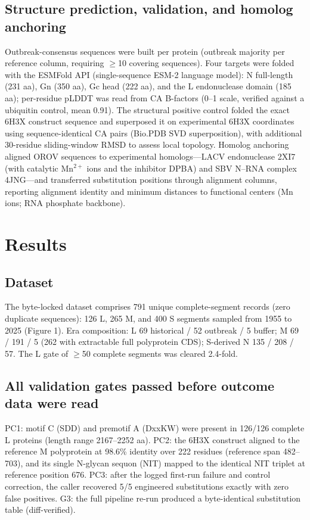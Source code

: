 \documentclass[12pt]{article}
\begin{document}
\subsection{Structure prediction, validation, and homolog anchoring}
Outbreak-consensus sequences were built per protein (outbreak majority per reference column, requiring $\geq$10 covering sequences). Four targets were folded with the ESMFold API (single-sequence ESM-2 language model): N full-length (231 aa), Gn (350 aa), Gc head (222 aa), and the L endonuclease domain (185 aa); per-residue pLDDT was read from CA B-factors (0--1 scale, verified against a ubiquitin control, mean 0.91). The structural positive control folded the exact 6H3X construct sequence and superposed it on experimental 6H3X coordinates using sequence-identical CA pairs (Bio.PDB SVD superposition), with additional 30-residue sliding-window RMSD to assess local topology. Homolog anchoring aligned OROV sequences to experimental homologs---LACV endonuclease 2XI7 (with catalytic Mn$^{2+}$ ions and the inhibitor DPBA) and SBV N--RNA complex 4JNG---and transferred substitution positions through alignment columns, reporting alignment identity and minimum distances to functional centers (Mn ions; RNA phosphate backbone).

\section{Results}
\subsection{Dataset}
The byte-locked dataset comprises 791 unique complete-segment records (zero duplicate sequences): 126 L, 265 M, and 400 S segments sampled from 1955 to 2025 (Figure 1). Era composition: L 69 historical / 52 outbreak / 5 buffer; M 69 / 191 / 5 (262 with extractable full polyprotein CDS); S-derived N 135 / 208 / 57. The L gate of $\geq$50 complete segments was cleared 2.4-fold.

\subsection{All validation gates passed before outcome data were read}
PC1: motif C (SDD) and premotif A (DxxKW) were present in 126/126 complete L proteins (length range 2167--2252 aa). PC2: the 6H3X construct aligned to the reference M polyprotein at 98.6\% identity over 222 residues (reference span 482--703), and its single N-glycan sequon (NIT) mapped to the identical NIT triplet at reference position 676. PC3: after the logged first-run failure and control correction, the caller recovered 5/5 engineered substitutions exactly with zero false positives. G3: the full pipeline re-run produced a byte-identical substitution table (diff-verified).
\end{document}
